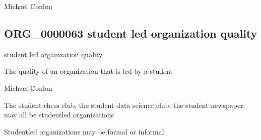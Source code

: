 \documentclass[letterpaper,10pt,english]{sphinxmanual}
\begin{document}
\begin{sphinxShadowBox}

\sphinxAtStartPar
Michael Conlon 
\end{sphinxShadowBox}
\begin{quote}

\ignorespaces \end{quote}


\subsection{ORG\_0000063 \sphinxhyphen{} student led organization quality}
\label{\detokenize{doc-ORG_0000063:org-0000063-student-led-organization-quality}}\label{\detokenize{doc-ORG_0000063:index-0}}\label{\detokenize{doc-ORG_0000063::doc}}
\begin{sphinxShadowBox}

\sphinxAtStartPar
student led organization quality
\end{sphinxShadowBox}

\begin{sphinxShadowBox}

\sphinxAtStartPar
The quality of an organization that is led by a student
\end{sphinxShadowBox}

\begin{sphinxShadowBox}

\sphinxAtStartPar
Michael Conlon 
\end{sphinxShadowBox}

\begin{sphinxShadowBox}

\sphinxAtStartPar
The student chess club, the student data science club, the student newspaper may all be student\sphinxhyphen{}led organizations
\end{sphinxShadowBox}

\begin{sphinxShadowBox}

\sphinxAtStartPar
Student\sphinxhyphen{}led organizations may be formal or informal
\end{sphinxShadowBox}
\end{document}
